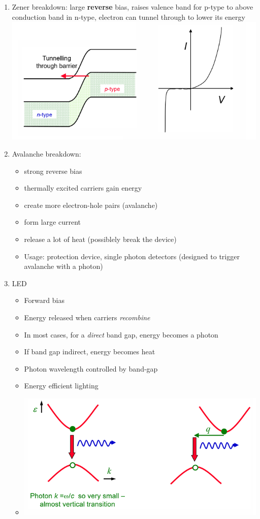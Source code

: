 \documentclass{article}
\theoremstyle{remark}
\theoremstyle{remark}
\begin{document}
\begin{enumerate}
\begin{itemize}
    \end{itemize}
    \item Zener breakdown: large \textbf{reverse} bias, raises valence band for p-type to above conduction band in n-type, electron can tunnel through to lower its energy\newline
        \includegraphics*[width=0.6\linewidth]{cmp_Zener_breakdown.png}
    \item Avalanche breakdown: \begin{itemize}
            \item strong reverse bias
            \item thermally excited carriers gain energy
            \item create more electron-hole pairs (avalanche)
            \item form large current
            \item release a lot of heat (possiblely break the device)
            \item Usage: protection device, single photon detectors (designed to trigger avalanche with a photon)
        \end{itemize}
    \item LED\begin{itemize}
            \item Forward bias
            \item Energy released when carriers \emph{recombine}
            \item In most cases, for a \emph{direct} band gap, energy becomes a photon
            \item If band gap indirect, energy becomes heat
            \item Photon wavelength controlled by band-gap
            \item Energy efficient lighting
            \item \includegraphics*[width=0.6\linewidth]{cmp_direct_indirect_band_gap.png}

\end{itemize}
\end{enumerate}
\end{document}
